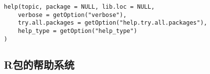 \begin{verbatim}
help(topic, package = NULL, lib.loc = NULL,
	verbose = getOption("verbose"),
	try.all.packages = getOption("help.try.all.packages"),
	help_type = getOption("help_type")
)
\end{verbatim}

	
	
	
	\subsection{R包的帮助系统}
	
	
	
	
	\appendix
	
	\backmatter
	
	
	
	
	
	
	\printindex


